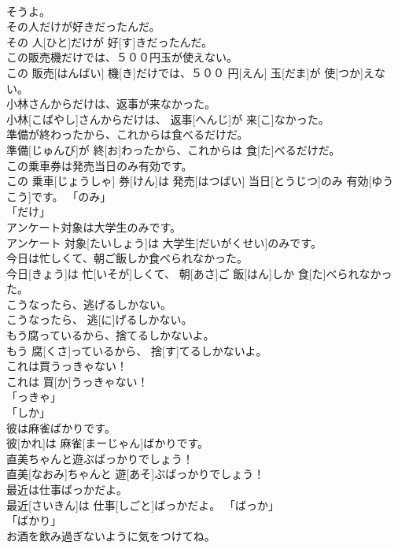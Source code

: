 \documentclass[8pt]{extreport}
\begin{document}
\begin{CJK}{UTF8}{min}
\\	そうよ。	
\\	その人だけが好きだったんだ。	
\\	その 人[ひと]だけが 好[す]きだったんだ。	
\\	この販売機だけでは、５００円玉が使えない。	
\\	この 販売[はんばい] 機[き]だけでは、５００ 円[えん] 玉[だま]が 使[つか]えない。	
\\	小林さんからだけは、返事が来なかった。	
\\	小林[こばやし]さんからだけは、 返事[へんじ]が 来[こ]なかった。	
\\	準備が終わったから、これからは食べるだけだ。	
\\	準備[じゅんび]が 終[お]わったから、これからは 食[た]べるだけだ。	
\\	この乗車券は発売当日のみ有効です。	
\\	この 乗車[じょうしゃ] 券[けん]は 発売[はつばい] 当日[とうじつ]のみ 有効[ゆうこう]です。	「のみ」
\\	「だけ」
\\	アンケート対象は大学生のみです。	
\\	アンケート 対象[たいしょう]は 大学生[だいがくせい]のみです。	
\\	今日は忙しくて、朝ご飯しか食べられなかった。	
\\	今日[きょう]は 忙[いそが]しくて、 朝[あさ]ご 飯[はん]しか 食[た]べられなかった。	
\\	こうなったら、逃げるしかない。	
\\	こうなったら、 逃[に]げるしかない。	
\\	もう腐っているから、捨てるしかないよ。	
\\	もう 腐[くさ]っているから、 捨[す]てるしかないよ。	
\\	これは買うっきゃない！	
\\	これは 買[か]うっきゃない！	
\\	「っきゃ」
\\	「しか」
\\	彼は麻雀ばかりです。	
\\	彼[かれ]は 麻雀[まーじゃん]ばかりです。	
\\	直美ちゃんと遊ぶばっかりでしょう！	
\\	直美[なおみ]ちゃんと 遊[あそ]ぶばっかりでしょう！	
\\	最近は仕事ばっかだよ。	
\\	最近[さいきん]は 仕事[しごと]ばっかだよ。	「ばっか」
\\	「ばかり」
\\	お酒を飲み過ぎないように気をつけてね。	

\end{CJK}
\end{document}
